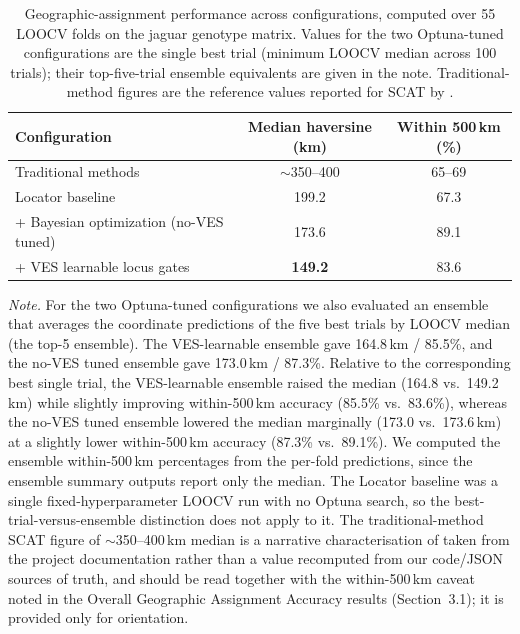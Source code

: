 \documentclass[twocolumn,10pt]{article}
\begin{document}
\begin{table}[t]
\centering
\caption{Geographic-assignment performance across configurations, computed over 55 LOOCV folds on
the jaguar genotype matrix. Values for the two Optuna-tuned configurations are the single best trial
(minimum LOOCV median across 100 trials); their top-five-trial ensemble equivalents are given in the
note. Traditional-method figures are the reference values reported for SCAT by
\citet{lazzari2025development}.}
\label{tab:results_summary}
\begin{tabular}{lcc}
\toprule
Configuration & Median haversine (km) & Within 500\,km (\%) \\
\midrule
Traditional methods \citep[SCAT;][]{lazzari2025development} & $\sim$350--400 & 65--69 \\
Locator baseline \citep[defaults;][]{battey2020predicting} & 199.2 & 67.3 \\
\quad + Bayesian optimization (no-VES tuned) & 173.6 & 89.1 \\
\quad + VES learnable locus gates & \textbf{149.2} & 83.6 \\
\bottomrule
\end{tabular}

\vspace{3pt}
{\footnotesize \emph{Note.} For the two Optuna-tuned configurations we also evaluated an ensemble
that averages the coordinate predictions of the five best trials by LOOCV median (the top-5
ensemble). The VES-learnable ensemble gave 164.8\,km / 85.5\%, and the no-VES tuned ensemble gave
173.0\,km / 87.3\%. Relative to the corresponding best single trial, the VES-learnable ensemble
raised the median (164.8 vs.\ 149.2\,km) while slightly improving within-500\,km accuracy (85.5\%
vs.\ 83.6\%), whereas the no-VES tuned ensemble lowered the median marginally (173.0 vs.\ 173.6\,km)
at a slightly lower within-500\,km accuracy (87.3\% vs.\ 89.1\%). We computed the ensemble
within-500\,km percentages from the per-fold predictions, since the ensemble summary outputs report
only the median. The Locator baseline was a single fixed-hyperparameter LOOCV run with no Optuna
search, so the best-trial-versus-ensemble distinction does not apply to it. The traditional-method
SCAT figure of $\sim$350--400\,km median is a narrative characterisation of
\citet{lazzari2025development} taken from the project documentation rather than a value recomputed
from our code/JSON sources of truth, and should be read together with the within-500\,km caveat
noted in the Overall Geographic Assignment Accuracy results (Section~3.1); it is provided only for
orientation.}
\end{table}
\end{document}
